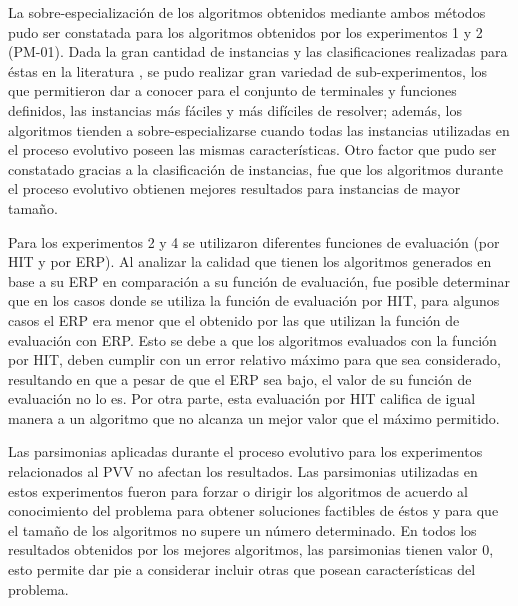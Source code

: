 La sobre-especialización de los algoritmos obtenidos mediante ambos métodos pudo ser constatada para los algoritmos obtenidos por los experimentos 1 y 2 (PM-01). Dada la gran cantidad de instancias y las clasificaciones realizadas para éstas en la literatura \citep{pisinger_2005}, se pudo realizar gran variedad de sub-experimentos, los que permitieron dar a conocer para el conjunto de terminales y funciones definidos, las instancias más fáciles y más difíciles de resolver; además, los algoritmos tienden a sobre-especializarse cuando todas las instancias utilizadas en el proceso evolutivo poseen las mismas características. Otro factor que pudo ser constatado gracias a la clasificación de instancias, fue que los algoritmos durante el proceso evolutivo obtienen mejores resultados para instancias de mayor tamaño.

Para los experimentos 2 y 4 se utilizaron diferentes funciones de evaluación (por HIT y por ERP). Al analizar la calidad que tienen los algoritmos generados en base a su ERP en comparación a su función de evaluación, fue posible determinar que en los casos donde se utiliza la función de evaluación por HIT, para algunos casos el ERP era menor que el obtenido por las que utilizan la función de evaluación con ERP. Esto se debe a que los algoritmos evaluados con la función por HIT, deben cumplir con un error relativo máximo para que sea considerado, resultando en que a pesar de que el ERP sea bajo, el valor de su función de evaluación no lo es. Por otra parte, esta evaluación por HIT califica de igual manera a un algoritmo que no alcanza un mejor valor que el máximo permitido.

Las parsimonias aplicadas durante el proceso evolutivo para los experimentos relacionados al PVV no afectan los resultados. Las parsimonias utilizadas en estos experimentos fueron para forzar o dirigir los algoritmos de acuerdo al conocimiento del problema para obtener soluciones factibles de éstos y para que el tamaño de los algoritmos no supere un número determinado. En todos los resultados obtenidos por los mejores algoritmos, las parsimonias tienen valor 0, esto permite dar pie a considerar incluir otras que posean características del problema.

